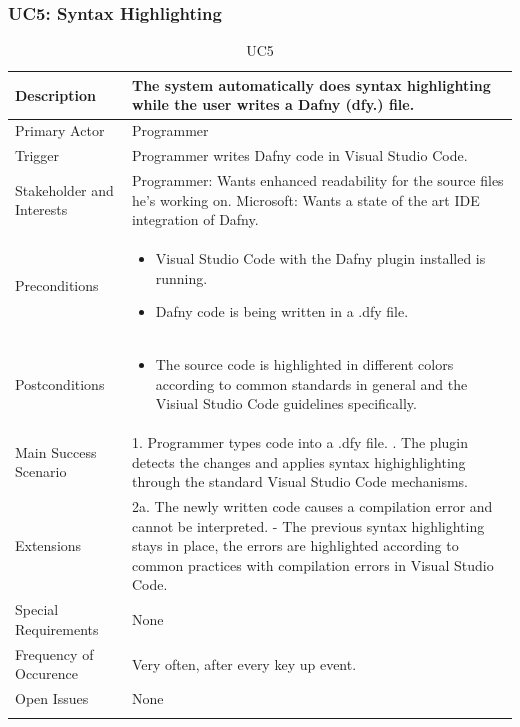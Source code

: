 \subsubsection{UC5: Syntax Highlighting}
\begin{longtable}{l | p{} }
	Description & The system automatically does syntax highlighting while the user writes a Dafny (dfy.) file.\\ \hline
	Primary Actor & Programmer\\ \hline
	Trigger & Programmer writes Dafny code in Visual Studio Code.\\ \hline
	Stakeholder and Interests & Programmer: Wants enhanced readability for the source files he's working on. \newline Microsoft: Wants a state of the art IDE integration of Dafny.\\ \hline
	Preconditions &
	\begin{itemize}
		\item Visual Studio Code with the Dafny plugin installed is running.
		\item Dafny code is being written in a .dfy file.
	\end{itemize}\\ \hline
	Postconditions &
	\begin{itemize}
		\item The source code is highlighted in different colors according to common standards in general and the Visiual Studio Code guidelines specifically.
	\end{itemize}\\ \hline
	Main Success Scenario & 
	1. Programmer types code into a .dfy file. \newline
	2. The plugin detects the changes and applies syntax highighlighting through the standard Visual Studio Code mechanisms.\\ \hline
	Extensions & 
	2a. The newly written code causes a compilation error and cannot be interpreted. \newline 
	- The previous syntax highlighting stays in place, the errors are highlighted according to common practices with compilation errors in Visual Studio Code. \\ \hline
	Special Requirements & None\\ \hline
	Frequency of Occurence & Very often, after every key up event.\\ \hline
	Open Issues & None \\ \hline
	\caption{UC5}
\end{longtable}

